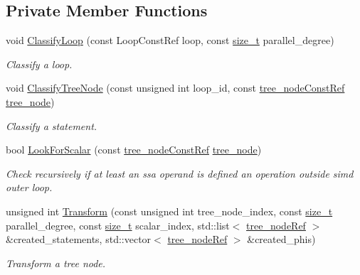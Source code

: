 \subsection*{Private Member Functions}
\begin{DoxyCompactItemize}
\item 
void \hyperlink{classVectorize_a0043972f172aca39c296d6a3a4559015}{Classify\+Loop} (const Loop\+Const\+Ref loop, const \hyperlink{tutorial__fpt__2017_2intro_2sixth_2test_8c_a7c94ea6f8948649f8d181ae55911eeaf}{size\+\_\+t} parallel\+\_\+degree)
\begin{DoxyCompactList}\small\item\em Classify a loop. \end{DoxyCompactList}\item 
void \hyperlink{classVectorize_acc3c1a7baaaf386b05c44ec4c8d6f3ce}{Classify\+Tree\+Node} (const unsigned int loop\+\_\+id, const \hyperlink{tree__node_8hpp_a3cf5d02292c940f3892425a5b5fdec3c}{tree\+\_\+node\+Const\+Ref} \hyperlink{classtree__node}{tree\+\_\+node})
\begin{DoxyCompactList}\small\item\em Classify a statement. \end{DoxyCompactList}\item 
bool \hyperlink{classVectorize_a34c9105b57eff7b44aa7671815adc537}{Look\+For\+Scalar} (const \hyperlink{tree__node_8hpp_a3cf5d02292c940f3892425a5b5fdec3c}{tree\+\_\+node\+Const\+Ref} \hyperlink{classtree__node}{tree\+\_\+node})
\begin{DoxyCompactList}\small\item\em Check recursively if at least an ssa operand is defined an operation outside simd outer loop. \end{DoxyCompactList}\item 
unsigned int \hyperlink{classVectorize_a9be0e93006fb6ab2ec0b36616b374069}{Transform} (const unsigned int tree\+\_\+node\+\_\+index, const \hyperlink{tutorial__fpt__2017_2intro_2sixth_2test_8c_a7c94ea6f8948649f8d181ae55911eeaf}{size\+\_\+t} parallel\+\_\+degree, const \hyperlink{tutorial__fpt__2017_2intro_2sixth_2test_8c_a7c94ea6f8948649f8d181ae55911eeaf}{size\+\_\+t} scalar\+\_\+index, std\+::list$<$ \hyperlink{tree__node_8hpp_a6ee377554d1c4871ad66a337eaa67fd5}{tree\+\_\+node\+Ref} $>$ \&created\+\_\+statements, std\+::vector$<$ \hyperlink{tree__node_8hpp_a6ee377554d1c4871ad66a337eaa67fd5}{tree\+\_\+node\+Ref} $>$ \&created\+\_\+phis)
\begin{DoxyCompactList}\small\item\em Transform a tree node. \end{DoxyCompactList}\item 

\end{DoxyCompactItemize}
